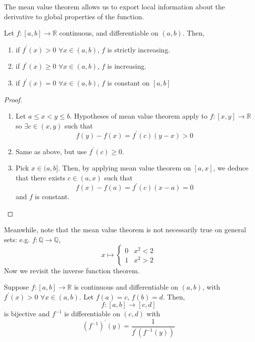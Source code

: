 \documentclass[10pt, a4paper, twoside]{report}
\begin{document}
The mean value theorem allows us to export local information about the derivative to global properties of the function.
\begin{corollary}
    Let \(f:[a,b]\to\mathbb{R}\) continuous, and differentiable on \((a,b)\). Then, 
    \begin{enumerate}
        \item if \(f^\prime(x)>0\) \(\forall x\in(a,b)\), \(f\) is strictly increasing.
        \item if \(f^\prime(x)\geq 0\) \(\forall x\in(a,b)\), \(f\) is increasing.
        \item if \(f^\prime(x)=0\) \(\forall x\in(a,b)\), \(f\) is constant on \([a,b]\)
    \end{enumerate}
    \label{coro:inc}
\end{corollary}
\begin{proof} \item[]
    \begin{enumerate}
        \item Let \(a\leq x<y\leq b\). Hypotheses of mean value theorem apply to \(f:[x,y]\to\mathbb{R}\) so \(\exists c\in(x,y)\) such that 
        \[f(y)-f(x)=f^\prime(c)(y-x)>0\]
        \item Same as above, but use \(f^\prime(c)\geq 0\).
        \item Pick \(x\in(a,b]\). Then, by applying mean value theorem on \([a,x]\), we deduce that there exists \(c\in(a,x)\) such that 
        \[f(x)-f(a)=f^\prime(c)(x-a)=0\]
        and \(f\) is constant.
    \end{enumerate}
\end{proof}
Meanwhile, note that the mean value theorem is not necessarily true on general sets: e.g. \(f:\mathbb{Q}\to\mathbb{Q}\),
\[x\mapsto\begin{cases}
    0 & x^2<2 \\
    1 & x^2>2
\end{cases}\]
Now we revisit the inverse function theorem.
\begin{theorem}
    Suppose \(f:[a,b]\to\mathbb{R}\) is continuous and differentiable on \((a,b)\), with \(f^\prime(x)>0\) \(\forall x\in(a,b)\). Let \(f(a)=c\), \(f(b)=d\). Then,
    \[f:[a,b]\to[c,d]\]
    is bijective and \(f^{-1}\) is differentiable on \((c,d)\) with
    \[(f^{-1})^\prime(y)=\frac{1}{f^\prime(f^{-1}(y))}\]
    \label{thm:ift_diff}
\end{theorem}
\end{document}
